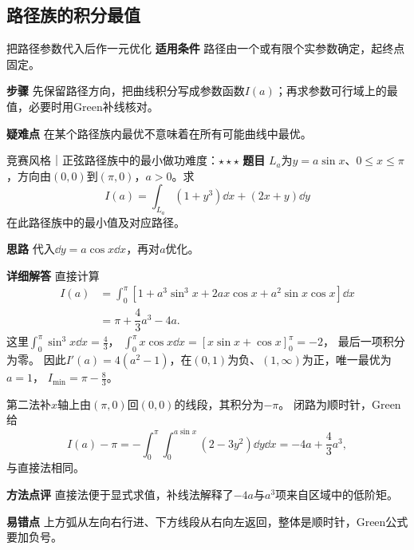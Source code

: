 \subsection{路径族的积分最值}\label{cf:pathfamily}
\begin{method}{把路径参数代入后作一元优化}
\textbf{适用条件} 路径由一个或有限个实参数确定，起终点固定。\par
\textbf{步骤} 先保留路径方向，把曲线积分写成参数函数$I(a)$；再求参数可行域上的最值，必要时用Green补线核对。\par
\textbf{疑难点} 在某个路径族内最优不意味着在所有可能曲线中最优。
\end{method}
\begin{example}{竞赛风格｜正弦路径族中的最小做功}{难度：$\star\star\star$}
\label{cf:ex:pathfamily}
\textbf{题目} $L_a$为$y=a\sin x$、$0\le x\le\pi$，方向由$(0,0)$到$(\pi,0)$，$a>0$。求
\[
I(a)=\int_{L_a}(1+y^3)\dd x+(2x+y)\dd y
\]
在此路径族中的最小值及对应路径。\par
\textbf{思路} 代入$\dd y=a\cos x\dd x$，再对$a$优化。\par
\textbf{详细解答} 直接计算
\[
\begin{aligned}
I(a)
&=\int_0^\pi
[1+a^3\sin^3x+2ax\cos x+a^2\sin x\cos x]\dd x\\
&=\pi+\dfrac43a^3-4a.
\end{aligned}
\]
这里$\int_0^\pi\sin^3x\dd x=\frac{4}{3}$，
$\int_0^\pi x\cos x\dd x=[x\sin x+\cos x]_0^\pi=-2$，
最后一项积分为零。
因此$I'(a)=4(a^2-1)$，在$(0,1)$为负、$(1,\infty)$为正，唯一最优为$a=1$，
$I_{\min}=\pi-\frac{8}{3}$。

第二法补$x$轴上由$(\pi,0)$回$(0,0)$的线段，其积分为$-\pi$。
闭路为顺时针，Green给
\[
I(a)-\pi
=-\int_0^\pi\int_0^{a\sin x}(2-3y^2)\dd y\dd x
=-4a+\dfrac43a^3,
\]
与直接法相同。\par
\textbf{方法点评} 直接法便于显式求值，补线法解释了$-4a$与$a^3$项来自区域中的低阶矩。\par
\textbf{易错点} 上方弧从左向右行进、下方线段从右向左返回，整体是顺时针，Green公式要加负号。
\end{example}

